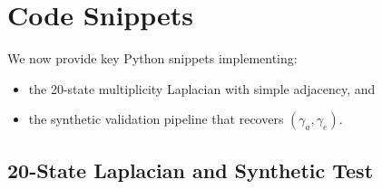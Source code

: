 \documentclass[11pt]{article}
\begin{document}
\section{Code Snippets}

We now provide key Python snippets implementing:
\begin{itemize}
  \item the 20-state multiplicity Laplacian with simple adjacency, and
  \item the synthetic validation pipeline that recovers $(\gamma_a,\gamma_e)$.
\end{itemize}

\subsection{20-State Laplacian and Synthetic Test}
\end{document}

